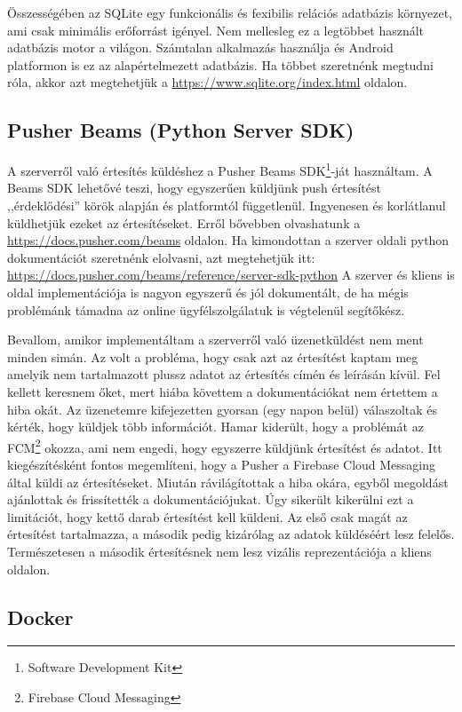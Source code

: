 \documentclass{thesis-ekf}
\theoremstyle{definition}
\theoremstyle{remark}
\begin{document}
Összességében az SQLite egy funkcionális és fexibilis relációs adatbázis környezet, ami csak minimális erőforrást igényel.
\cite{sqlite}
Nem mellesleg ez a legtöbbet használt adatbázis motor a világon. 
Számtalan alkalmazás használja és Android platformon is ez az alapértelmezett adatbázis.
Ha többet szeretnénk megtudni róla, akkor azt megtehetjük a \url{https://www.sqlite.org/index.html} oldalon.

\subsection{Pusher Beams (Python Server SDK)}\label{pusher_server}

A szerverről való értesítés küldéshez a Pusher Beams SDK\footnote{Software Development Kit}-ját használtam.
A Beams SDK lehetővé teszi, hogy egyszerűen küldjünk push értesítést ,,érdeklődési'' körök alapján és platformtól függetlenül.
Ingyenesen és korlátlanul küldhetjük ezeket az értesítéseket. Erről bővebben olvashatunk a \url{https://docs.pusher.com/beams} oldalon.
Ha kimondottan a szerver oldali python dokumentációt szeretnénk elolvasni, azt megtehetjük itt: \url{https://docs.pusher.com/beams/reference/server-sdk-python}
A szerver és kliens is oldal implementációja is nagyon egyszerű és jól dokumentált, de ha mégis problémánk támadna az online ügyfélszolgálatuk is végtelenül segítőkész.

Bevallom, amikor implementáltam a szerverről való üzenetküldést nem ment minden simán.
Az volt a probléma, hogy csak azt az értesítést kaptam meg amelyik nem tartalmazott plussz adatot az értesítés címén és leírásán kívül.
Fel kellett keresnem őket, mert hiába követtem a dokumentációkat nem értettem a hiba okát.
Az üzenetemre kifejezetten gyorsan (egy napon belül) válaszoltak és kérték, hogy küldjek több információt.
Hamar kiderült, hogy a problémát az FCM\footnote{Firebase Cloud Messaging} okozza, ami nem engedi, hogy egyszerre küldjünk értesítést és adatot.
Itt kiegészítésként fontos megemlíteni, hogy a Pusher a Firebase Cloud Messaging által küldi az értesítéseket.
Miután rávilágítottak a hiba okára, egyből megoldást ajánlottak és frissítették a dokumentációjukat.
Úgy sikerült kikerülni ezt a limitációt, hogy kettő darab értesítést kell küldeni.
Az első csak magát az értesítést tartalmazza, a második pedig kizárólag az adatok küldéséért lesz felelős.
Természetesen a második értesítésnek nem lesz vizális reprezentációja a kliens oldalon.

\subsection{Docker}\label{docker}
\end{document}
